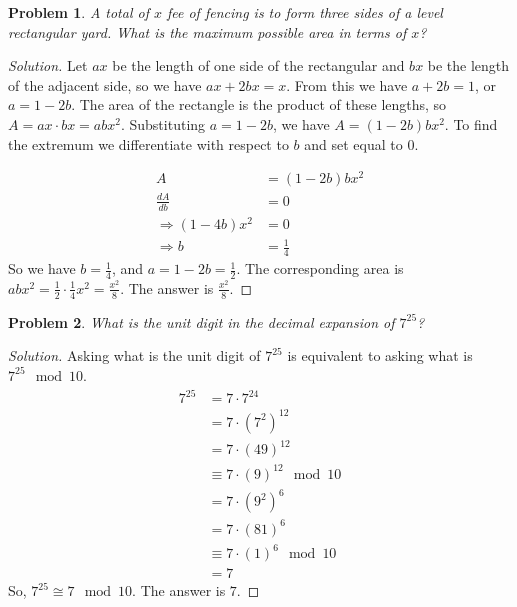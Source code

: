 \documentclass[12pt,oneside]{book}
\theoremstyle{mystyle}
\newtheorem{problem}{Problem}[section]
\begin{document}
\begin{problem}
A total of $x$ fee of fencing is to form three sides of a level rectangular yard. What is the maximum possible area in terms of $x$?
\end{problem}
\begin{proof}[Solution]
Let $ax$ be the length of one side of the rectangular and $bx$ be the length of the adjacent side, so we have $ax+2bx = x$. From this we have $a+2b = 1$, or $a = 1-2b$. The area of the rectangle is the product of these lengths, so $A = ax\cdot bx = abx^2$. Substituting $a = 1-2b$, we have $A = (1-2b)bx^2$. To find the extremum we differentiate with respect to $b$ and set equal to $0$.

\begin{align}
    A &= (1-2b)bx^2 \\
    \frac{dA}{db} &= 0 \\
    \Rightarrow (1-4b)x^2 &= 0 \\
    \Rightarrow b &= \frac{1}{4}
\end{align}
So we have $b = \frac{1}{4}$, and $a = 1-2b = \frac{1}{2}$. The corresponding area is $abx^2 = \frac{1}{2}\cdot \frac{1}{4} x^2 = \frac{x^2}{8}$. The answer is $\frac{x^2}{8}$.
\end{proof}

\begin{problem}
What is the unit digit in the decimal expansion of $7^{25}$?
\end{problem}
\begin{proof}[Solution]
    Asking what is the unit digit of $7^{25}$ is equivalent to asking what is $7^{25} \mod 10$.
\begin{align}
    \nonumber 7^{25} &= 7\cdot7^{24}\\
    \nonumber &= 7\cdot(7^2)^{12} \\
    \nonumber &= 7\cdot(49)^{12} \\
    \nonumber &\equiv 7\cdot(9)^{12} \mod 10\\
    \nonumber &= 7\cdot (9^2)^6 \\
    \nonumber &= 7 \cdot (81)^6 \\
    \nonumber &\equiv 7 \cdot (1)^6 \mod 10 \\
    \nonumber &= 7
\end{align}
So, $7^{25} \cong 7 \mod 10$. The answer is $7$.
\end{proof}
\end{document}
